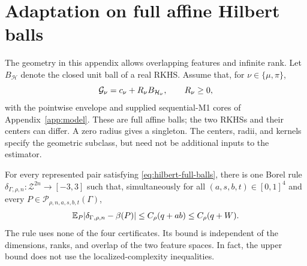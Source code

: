 \section{Adaptation on full affine Hilbert balls}
\label{app:hilbert-adaptation}

The geometry in this appendix allows overlapping features and infinite
rank.  Let $B_{\mathcal H}$ denote the closed unit ball of a real RKHS.
Assume that, for $\nu\in\{\mu,\pi\}$,
\begin{equation}
 \mathcal G_\nu=c_\nu+R_\nu B_{\mathcal H_\nu},\qquad R_\nu\ge0,
 \label{eq:hilbert-full-balls}
\end{equation}
with the pointwise envelope and supplied sequential-M1 cores of
Appendix~\ref{app:model}.  These are full affine balls; the two RKHSs and
their centers can differ.  A zero radius gives a singleton.  The centers,
radii, and kernels specify the geometric subclass, but need not be
additional inputs to the estimator.

\begin{theorem}
\label{thm:hilbert-adaptation}
For every represented pair satisfying \eqref{eq:hilbert-full-balls},
there is one Borel rule $\delta_{\Gamma,\rho,n}:\mathcal Z^{2n}\to[-3,3]$
such that, simultaneously for all $(a,s,b,t)\in[0,1]^4$ and every
$P\in\mathcal P_{\rho,n,a,s,b,t}(\Gamma)$,
\begin{equation}
 \mathbb E_P|\delta_{\Gamma,\rho,n}-\beta(P)|
 \le C_\rho(q+ab)\le C_\rho(q+W).
 \label{eq:hilbert-adaptation-rate}
\end{equation}
The rule uses none of the four certificates.  Its bound is independent of
the dimensions, ranks, and overlap of the two feature spaces.  In fact,
the upper bound does not use the localized-complexity inequalities.
\end{theorem}

